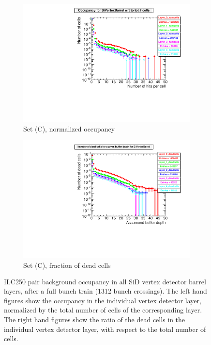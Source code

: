 \begin{figure}[htb]
\begin{subfigure}[b]{0.49\textwidth}
   \centering
    \includegraphics[width=\textwidth]{Figures/Pairs/Appendix/occupancy_numcells_SiVertexBarrel_ILC250_SetC_corrected_Barrel_size.pdf}
   \caption{Set (C), normalized occupancy}
   \end{subfigure}
   \hfill
    \begin{subfigure}[b]{0.49\textwidth}
   \centering
   \includegraphics[width=\textwidth]{Figures/Pairs/Appendix/occupancy_deadcells_SiVertexBarrel_ILC250_SetC_corrected_Barrel_size.pdf}
   \caption{Set (C), fraction of dead cells}
   \end{subfigure}
   \caption[Pair background occupancy in all SiD vertex detector barrel layers for the ILC250]{ILC250 pair background occupancy in all SiD vertex detector barrel layers, after a full bunch train (1312 bunch crossings).
   The left hand figures show the occupancy in the individual vertex detector layer, normalized by the total number of cells of the corresponding layer.
   The right hand figures show the ratio of the dead cells in the individual vertex detector layer, with respect to the total number of cells.
   }
   \label{fig:PairBkg:ILC250_Occupancy_Layers_VXDBarrel}
 \end{figure}
